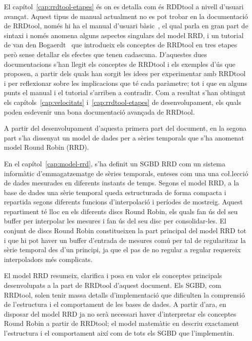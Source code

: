 El capítol~\ref{cap:rrdtool-etapes} és on es detalla com és RDDtool a nivell d'usuari avançat. Aquest tipus de manual actualment no es pot trobar en la documentació de RRDtool, només hi ha el manual d'usuari bàsic~\cite{rrdtool}, el qual parla en gran part de sintaxi i només anomena alguns aspectes singulars del model RRD, i un tutorial de van den Bogaerdt~\cite{vandenbogaerdt} que introdueix els conceptes de RRDtool en tres etapes però sense detallar els efectes que tenen cadascuna. 
D'aquestes dues documentacions s'han llegit els conceptes de RRDtool i els exemples d'ús que proposen, a partir dels quals han sorgit les idees per experimentar amb RRDtool i per reflexionar sobre les implicacions que té cada paràmetre; tot i que en alguns punts el manual i el tutorial s'arriben a contradir. 
Com a resultat s'han obtingut els capítols~\ref{cap:velocitats} i~\ref{cap:rrdtool-etapes} de desenvolupament,  els quals poden esdevenir una bona documentació avançada de RRDtool.


A partir del desenvolupament d'aquesta primera part del document, en la segona part s'ha dissenyat un model de dades per a sèries temporals que s'ha anomenat model Round Robin (RRD).

En el capítol~\ref{cap:model-rrd}, s'ha definit un SGBD RRD com un sistema informàtic d'emmagatzematge de sèries temporals, enteses com una  una co\l.lecció de dades mesurades en diferents instants de temps. Segons el model RRD, a la base de dades una sèrie temporal queda estructurada de forma compacta i repartida segons diferents funcions d'interpolació i períodes de mostreig. Aquest repartiment té lloc en els diferents discs Round Robin, els quals fan ús del seu buffer per interpolar les mesures i fan ús del seu disc per consolidar-les. 
El conjunt de discs Round Robin constitueixen la part principal del model RRD tot i que hi pot haver un buffer d'entrada de mesures comú per tal de regularitzar la sèrie temporal des d'un principi, ja que el pas de no regular a regular requereix interpoladors més complicats.

El model RRD resumeix, clarifica i posa en valor els conceptes principals desenvolupats a la part de RRDtool d'aquest document. Els SGBD, com RRDtool, solen tenir massa detalls d'implementació que dificulten la comprensió de l'estructura i el comportament de les bases de dades. 
A partir d'ara, en disposar del model RRD ja no serà necessari haver d'interpretar els conceptes Round Robin a partir de RRDtool; el model matemàtic en descriu exactament l'estructura i el comportament així com de tots els SGBD que l'implementin.

